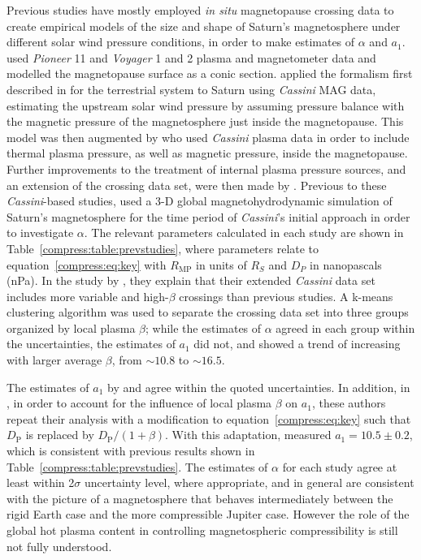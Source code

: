 Previous studies have mostly employed \textit{in situ} magnetopause crossing data to create empirical models of the size and shape of Saturn's magnetosphere under different solar wind pressure conditions, in order to make estimates of $\alpha$ and $a_1$. \citet{slavin1985} used \textit{Pioneer} 11 and \textit{Voyager} 1 and 2 plasma and magnetometer data and modelled the magnetopause surface as a conic section. \citet{arridge2006} applied the formalism first described in \citet{shue1997} for the terrestrial system to Saturn using \textit{Cassini} MAG data, estimating the upstream solar wind pressure by assuming pressure balance with the magnetic pressure of the magnetosphere just inside the magnetopause. This model was then augmented by \citet{kanani2010} who used \textit{Cassini} plasma data in order to include thermal plasma pressure, as well as magnetic pressure, inside the magnetopause. Further improvements to the treatment of internal plasma pressure sources, and an extension of the crossing data set, were then made by \citet{pilkington2015}. Previous to these \textit{Cassini}-based studies, \citet{hansen2005} used a 3-D global magnetohydrodynamic simulation of Saturn's magnetosphere for the time period of \textit{Cassini}'s initial approach in order to investigate $\alpha$. The relevant parameters calculated in each study are shown in Table~\ref{compress:table:prevstudies}, where parameters relate to equation~\ref{compress:eq:key} with $R_\mathrm{MP}$ in units of $\si{R_S}$ and $D_{P}$ in nanopascals (\si{nPa}). In the study by \citet{pilkington2015}, they explain that their extended \textit{Cassini} data set includes more variable and high-$\beta$ crossings than previous studies. A k-means clustering algorithm was used to separate the crossing data set into three groups organized by local plasma $\beta$; while the estimates of $\alpha$ agreed in each group within the uncertainties, the estimates of $a_1$ did not, and showed a trend of increasing with larger average $\beta$, from ${\sim}10.8$ to ${\sim}16.5$.

The estimates of $a_1$ by \citet{arridge2006} and \citet{kanani2010} agree within the quoted uncertainties. In addition, in \citet{pilkington2015}, in order to account for the influence of local plasma $\beta$ on $a_1$, these authors repeat their analysis with a modification to equation~\ref{compress:eq:key} such that $D_\mathrm{P}$ is replaced by $D_\mathrm{P}/(1+\beta)$. With this adaptation, \citet{pilkington2015} measured $a_1 = 10.5 \pm 0.2$, which is consistent with previous results shown in Table~\ref{compress:table:prevstudies}. The estimates of $\alpha$ for each study agree at least within 2$\sigma$ uncertainty level, where appropriate, and in general are consistent with the picture of a magnetosphere that behaves intermediately between the rigid Earth case and the more compressible Jupiter case. However the role of the global hot plasma content in controlling magnetospheric compressibility is still not fully understood.

